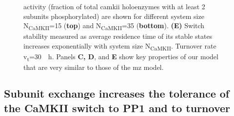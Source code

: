 \documentclass[9pt,lineno,doublespacing]{elife}
\newcommand\SUB[2]{#1\textsubscript{#2}}
\begin{document}
\begin{figure}[t]
{        activity (fraction of total \gls{camkii} holoenzymes with at least 2
        subunits phosphorylated) are shown for different system size
        \SUB{N}{CaMKII}=15 (\textbf{top}) and \SUB{N}{CaMKII}=35
        (\textbf{bottom}). \textbf{(E)} Switch stability measured as average
        residence time of its stable states increases exponentially with system
        size \SUB{N}{CaMKII}. Turnover rate \SUB{v}{t}=\SI{30}{\per \hour}.
        Panels \textbf{C, D}, and \textbf{E} show key properties of our model
        that are very similar to those of the \gls{mz} model.
    }\label{fig:validation} 
\end{figure}


\subsection{Subunit exchange increases the tolerance of the CaMKII switch to PP1
and to turnover}\label{subsec:result_tolerance}
\end{document}

